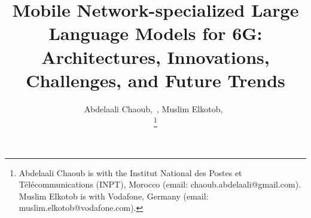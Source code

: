 \documentclass[transmag]{IEEEtran}
\begin{document}
\title{Mobile Network-specialized Large Language Models for 6G: Architectures, Innovations, Challenges, and Future Trends}%
\author{{{Abdelaali Chaoub},~,
{Muslim Elkotob},~
}

\thanks{
Abdelaali Chaoub is with the Institut National des Postes et Télécommunications (INPT), Morocco (email: chaoub.abdelaali@gmail.com).
Muslim Elkotob is with Vodafone, Germany (email: muslim.elkotob@vodafone.com).
}
}
\maketitle








\begin{spacing}{}
    
    
\end{spacing}

\end{document}
